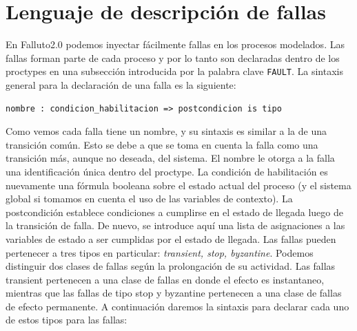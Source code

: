 \documentclass[pdftex,a4paper,12pt]{book}
\begin{document}
\section{Lenguaje de descripci\'on de fallas}
En Falluto2.0 podemos inyectar f\'acilmente fallas en los procesos modelados. Las fallas forman parte de cada proceso y por lo tanto son declaradas dentro de los proctypes en una subsecci\'on introducida por la palabra clave \texttt{FAULT}. La sintaxis general para la declaraci\'on de una falla es la siguiente: \begin{verbatim}nombre : condicion_habilitacion => postcondicion is tipo\end{verbatim}
Como vemos cada falla tiene un nombre, y su sintaxis es similar a la de una transici\'on com\'un. Esto se debe a que se toma en cuenta la falla como una transici\'on m\'as, aunque no deseada, del sistema. El nombre le otorga a la falla una identificaci\'on \'unica dentro del proctype. La condici\'on de habilitaci\'on es nuevamente una f\'ormula booleana sobre el estado actual del proceso (y el sistema global si tomamos en cuenta el uso de las variables de contexto). La postcondici\'on establece condiciones a cumplirse en el estado de llegada luego de la transici\'on de falla. De nuevo, se introduce aqu\'i una lista de asignaciones a las variables de estado a ser cumplidas por el estado de llegada. Las fallas pueden pertenecer a tres tipos en particular: \textit{transient, stop, byzantine}. Podemos distinguir dos clases de fallas seg\'un la prolongaci\'on de su actividad. Las fallas transient pertenecen a una clase de fallas en donde el efecto es instantaneo, mientras que las fallas de tipo stop y byzantine pertenecen a una clase de fallas de efecto permanente. A continuaci\'on daremos la sintaxis para declarar cada uno de estos tipos para las fallas:
\end{document}
